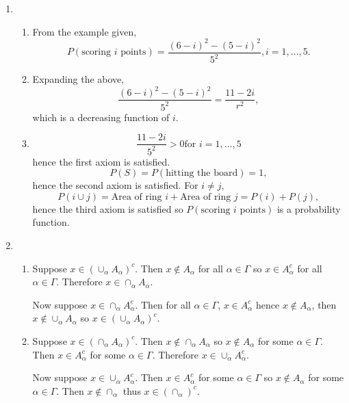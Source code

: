 \documentclass{article}
\begin{document}
\begin{enumerate}
    \item \begin{enumerate}
        \item From the example given, \[
            P(\text{scoring } i \text{ points}) = \frac{(6 - i)^2 - (5 - i)^2}{5^2}, i = 1, ..., 5.
            \]

        \item Expanding the above,
        \[ \frac{(6 - i)^2 - (5 - i)^2}{5^2} = \frac{11 - 2i}{r^2}, \]
        which is a decreasing function of $i$.

        \item \[
        \frac{11 - 2i}{5^2} > 0 \text{for } i = 1, ..., 5
        \]
        hence the first axiom is satisfied.
        \[ P(S) = P(\text{hitting the board}) = 1, \]
        hence the second axiom is satisfied. For $i \neq j$,
        \[ P(i \cup j) = \text{Area of ring } i + \text{Area of ring } j
        = P(i) + P(j), \]
        hence the third axiom is satisfied so $P(\text{scoring } i \text{ points})$
        is a probability function.
    \end{enumerate}

    \item \begin{enumerate}
        \item Suppose $x \in (\cup_{\alpha} A_{\alpha})^c$. Then $x \notin A_{\alpha}$ for all
        $\alpha \in \Gamma$ so $x \in A_{\alpha}^{c}$ for all $\alpha \in \Gamma$. Therefore
        $x \in \cap_{\alpha} A_{\alpha}$.

        Now suppose $x \in \cap_{\alpha} A_{\alpha}^{c}$. Then for all $\alpha \in \Gamma$,
        $x \in A_{\alpha}^{c}$ hence $x \notin A_{\alpha}$, then
        $x \notin \cup_{\alpha} A_{\alpha}$ so $x \in (\cup_{\alpha} A_{\alpha})^{c}$.

        \item Suppose $x \in (\cap_{\alpha} A_{\alpha})^{c}$. Then
        $x \notin \cap_{\alpha} A_{\alpha}$ so $x \notin A_{\alpha}$ for some
        $\alpha \in \Gamma$. Then $x \in A_{\alpha}^{c}$ for some $\alpha \in \Gamma$.
        Therefore $x \in \cup_{\alpha} A_{\alpha}^{c}$.

        Now suppose $x \in \cup_{\alpha} A_{\alpha}^{c}$. Then $x \in A_{\alpha}^{c}$ for some
        $\alpha \in \Gamma$ so $x \notin A_{\alpha}$ for some $\alpha \in \Gamma$. Then
        $x \notin \cap_{\alpha}$ thus $x \in (\cap_{\alpha})^{c}$.
    \end{enumerate}


\end{enumerate}
\end{document}
